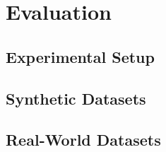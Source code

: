 \chapter{Evaluation}%
\label{sec:eval}

\section{Experimental Setup}%
\label{sec:eval:setup}

\section{Synthetic Datasets}%
\label{sec:eval:synthetic}

\section{Real-World Datasets}%
\label{sec:eval:real}
